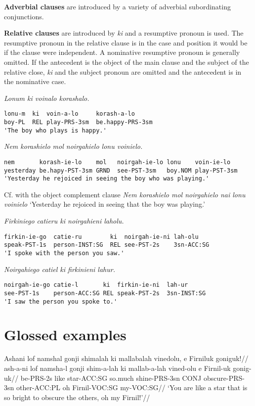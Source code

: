 \documentclass[
  a4paper,
]{article}
\begin{document}
\textbf{Adverbial clauses} are introduced by a variety of adverbial
subordinating conjunctions.

\textbf{Relative clauses} are introduced by \emph{ki} and a resumptive
pronoun is used. The resumptive pronoun in the relative clause is in the
case and position it would be if the clause were independent. A
nominative resumptive pronoun is generally omitted. If the antecedent is
the object of the main clause and the subject of the relative close,
\emph{ki} and the subject pronoun are omitted and the antecedent is in
the nominative case.

\emph{Lonum ki voinalo korashalo.}

\begin{verbatim}
lonu-m  ki  voin-a-lo     korash-a-lo
boy-PL  REL play-PRS-3sm  be.happy-PRS-3sm
'The boy who plays is happy.'
\end{verbatim}

\emph{Nem korashielo mol noirgahielo lonu voinielo.}

\begin{verbatim}
nem       korash-ie-lo    mol   noirgah-ie-lo lonu    voin-ie-lo
yesterday be.hapy-PST-3sm GRND  see-PST-3sm   boy.NOM play-PST-3sm
'Yesterday he rejoiced in seeing the boy who was playing.'
\end{verbatim}

Cf. with the object complement clause \emph{Nem korashielo mol
noirgahielo nai lonu voinielo} `Yesterday he rejoiced in seeing that the
boy was playing.'

\emph{Firkiniego catieru ki noirgahieni laholu.}

\begin{verbatim}
firkin-ie-go  catie-ru        ki  noirgah-ie-ni lah-olu
speak-PST-1s  person-INST:SG  REL see-PST-2s    3sn-ACC:SG
'I spoke with the person you saw.'
\end{verbatim}

\emph{Noirgahiego catiel ki firkinieni lahur.}

\begin{verbatim}
noirgah-ie-go catie-l       ki  firkin-ie-ni  lah-ur
see-PST-1s    person-ACC:SG REL speak-PST-2s  3sn-INST:SG
'I saw the person you spoke to.'
\end{verbatim}

\hypertarget{glossed-examples}{%
\section{Glossed examples}\label{glossed-examples}}

\ex \begingl \glpreamble Ashani lof namshal gonji shimalah ki mallabalah
vinedolu, e Firniluk goniguk!// \gla ash-a-ni lof namsha-l gonji
shim-a-lah ki mallab-a-lah vined-olu e Firnil-uk gonig-uk//
\glb be-PRS-2s like star-ACC:SG so.much shine-PRS-3sn CONJ
obscure-PRS-3sn other-ACC:PL oh Firnil-VOC:SG my-VOC:SG// \glft `You are
like a star that is so bright to obscure the others, oh my Firnil!'//
\endgl \xe
\end{document}
